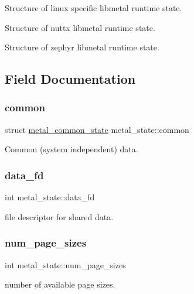 Structure of linux specific libmetal runtime state.

Structure of nuttx libmetal runtime state.

Structure of zephyr libmetal runtime state. 

\subsection{Field Documentation}
\mbox{\label{structmetal__state_aa36ac30ed6ef6439baea425191af0968}} 
\subsubsection{\texorpdfstring{common}{common}}
{\footnotesize\ttfamily struct \hyperlink{structmetal__common__state}{metal\+\_\+common\+\_\+state} metal\+\_\+state\+::common}

Common (system independent) data. \mbox{\label{structmetal__state_acb0f8a3441201130f4d59045d66d9b77}} 
\subsubsection{\texorpdfstring{data\+\_\+fd}{data\_fd}}
{\footnotesize\ttfamily int metal\+\_\+state\+::data\+\_\+fd}

file descriptor for shared data. \mbox{\label{structmetal__state_a08ea681743f49b2410a685518b033ce3}} 
\subsubsection{\texorpdfstring{num\+\_\+page\+\_\+sizes}{num\_page\_sizes}}
{\footnotesize\ttfamily int metal\+\_\+state\+::num\+\_\+page\+\_\+sizes}

number of available page sizes. \mbox{\label{structmetal__state_ac47375715b2e69ecb17b3a3714ae5c42}} 
